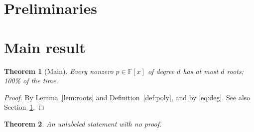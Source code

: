 \documentclass{article}
\newtheorem{theorem}{Theorem}
\newtheorem{lemma}{Lemma}
\newcommand{\F}{\mathbb{F}}
\begin{document}
\section{Preliminaries}\label{sec:prelim}

\section{Main result}
\begin{theorem}[Main]\label{thm:main}
Every nonzero $p \in \F[x]$ of degree $d$ has at most $d$ roots; 100\% of the time.
\end{theorem}
\begin{proof}
By Lemma~\ref{lem:roots} and Definition~\ref{def:poly}, and by \eqref{eq:deg}.
See also Section~\ref{sec:prelim}.
\end{proof}
\begin{theorem}
An unlabeled statement with no proof.
\end{theorem}
\end{document}
